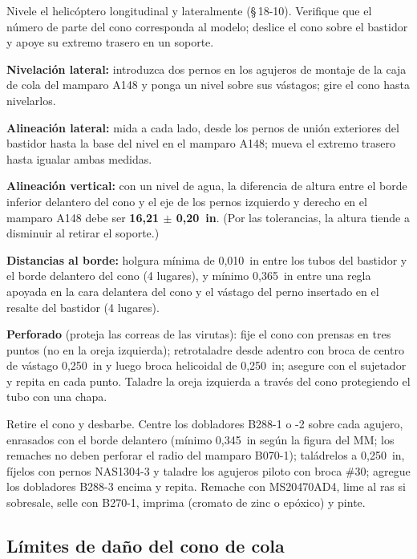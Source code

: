 \begin{pasos}
\item Nivele el helicóptero longitudinal y lateralmente (\S\,18-10). Verifique que el número de parte del cono corresponda al modelo; deslice el cono sobre el bastidor y apoye su extremo trasero en un soporte.
\item \textbf{Nivelación lateral:} introduzca dos pernos en los agujeros de montaje de la caja de cola del mamparo A148 y ponga un nivel sobre sus vástagos; gire el cono hasta nivelarlos.
\item \textbf{Alineación lateral:} mida a cada lado, desde los pernos de unión exteriores del bastidor hasta la base del nivel en el mamparo A148; mueva el extremo trasero hasta igualar ambas medidas.
\item \textbf{Alineación vertical:} con un nivel de agua, la diferencia de altura entre el borde inferior delantero del cono y el eje de los pernos izquierdo y derecho en el mamparo A148 debe ser \textbf{16,21 $\pm$ 0,20~in}. (Por las tolerancias, la altura tiende a disminuir al retirar el soporte.)
\item \textbf{Distancias al borde:} holgura mínima de 0,010~in entre los tubos del bastidor y el borde delantero del cono (4 lugares), y mínimo 0,365~in entre una regla apoyada en la cara delantera del cono y el vástago del perno insertado en el resalte del bastidor (4 lugares).
\item \textbf{Perforado} (proteja las correas de las virutas): fije el cono con prensas en tres puntos (no en la oreja izquierda); retrotaladre desde adentro con broca de centro de vástago 0,250~in y luego broca helicoidal de 0,250~in; asegure con el sujetador y repita en cada punto. Taladre la oreja izquierda a través del cono protegiendo el tubo con una chapa.
\item Retire el cono y desbarbe. Centre los dobladores B288-1 o -2 sobre cada agujero, enrasados con el borde delantero (mínimo 0,345~in según la figura del MM; los remaches no deben perforar el radio del mamparo B070-1); taládrelos a 0,250~in, fíjelos con pernos NAS1304-3 y taladre los agujeros piloto con broca \#30; agregue los dobladores B288-3 encima y repita. Remache con MS20470AD4, lime al ras si sobresale, selle con B270-1, imprima (cromato de zinc o epóxico) y pinte.
\end{pasos}

\subsection{Límites de daño del cono de cola}

